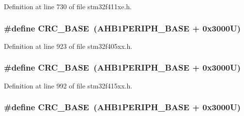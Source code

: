 Definition at line 730 of file stm32f411xe.\+h.

\subsubsection[{\texorpdfstring{C\+R\+C\+\_\+\+B\+A\+SE}{CRC_BASE}}]{\setlength{\rightskip}{0pt plus 5cm}\#define C\+R\+C\+\_\+\+B\+A\+SE~({\bf A\+H\+B1\+P\+E\+R\+I\+P\+H\+\_\+\+B\+A\+SE} + 0x3000\+U)}\hypertarget{group___peripheral__registers__structures_ga656a447589e785594cbf2f45c835ad7e}{}\label{group___peripheral__registers__structures_ga656a447589e785594cbf2f45c835ad7e}


Definition at line 923 of file stm32f405xx.\+h.

\subsubsection[{\texorpdfstring{C\+R\+C\+\_\+\+B\+A\+SE}{CRC_BASE}}]{\setlength{\rightskip}{0pt plus 5cm}\#define C\+R\+C\+\_\+\+B\+A\+SE~({\bf A\+H\+B1\+P\+E\+R\+I\+P\+H\+\_\+\+B\+A\+SE} + 0x3000\+U)}\hypertarget{group___peripheral__registers__structures_ga656a447589e785594cbf2f45c835ad7e}{}\label{group___peripheral__registers__structures_ga656a447589e785594cbf2f45c835ad7e}


Definition at line 992 of file stm32f415xx.\+h.

\subsubsection[{\texorpdfstring{C\+R\+C\+\_\+\+B\+A\+SE}{CRC_BASE}}]{\setlength{\rightskip}{0pt plus 5cm}\#define C\+R\+C\+\_\+\+B\+A\+SE~({\bf A\+H\+B1\+P\+E\+R\+I\+P\+H\+\_\+\+B\+A\+SE} + 0x3000\+U)}\hypertarget{group___peripheral__registers__structures_ga656a447589e785594cbf2f45c835ad7e}{}\label{group___peripheral__registers__structures_ga656a447589e785594cbf2f45c835ad7e}


